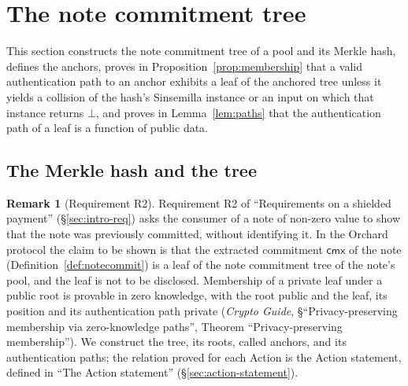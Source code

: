 \documentclass[11pt,a4paper]{article}
\theoremstyle{definition}
\newtheorem{remark}[theorem]{Remark}
\newcommand{\cmx}{\mathsf{cmx}}
\begin{document}
\section{The note commitment tree}\label{sec:tree}

This section constructs the note commitment tree of a pool and its Merkle
hash, defines the anchors, proves in Proposition~\ref{prop:membership} that a
valid authentication path to an anchor exhibits a leaf of the anchored tree
unless it yields a collision of the hash's Sinsemilla instance or an input on
which that instance returns $\bot$, and proves in Lemma~\ref{lem:paths} that
the authentication path of a leaf is a function of public data.

\subsection{The Merkle hash and the tree}\label{sec:tree-hash}

\begin{remark}[Requirement R2]
Requirement R2 of ``Requirements on a shielded payment''
(\S\ref{sec:intro-req}) asks the consumer of a note of non-zero value to
show that the note was previously committed, without identifying it. In the
Orchard protocol the claim to be shown is that the extracted commitment
$\cmx$ of the note (Definition~\ref{def:notecommit}) is a leaf of the note
commitment tree of the note's pool, and the leaf is not to be disclosed.
Membership of a private leaf under a public root is provable in zero
knowledge, with the root public and the leaf, its position and its
authentication path private (\emph{Crypto Guide}, \S``Privacy-preserving
membership via zero-knowledge paths'', Theorem ``Privacy-preserving
membership''). We construct the tree, its roots, called anchors, and its
authentication paths; the relation proved for each Action is the Action
statement, defined in ``The Action statement'' (\S\ref{sec:action-statement}).
\end{remark}
\end{document}
